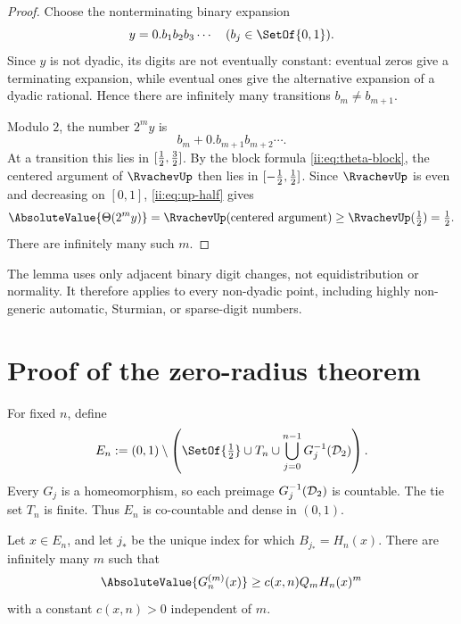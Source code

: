 \begin{proof}
Choose the nonterminating binary expansion
\[
 y=0.b_1b_2b_3\cdots\quad(b_j\in\SetOf{0,1}).
\]
Since $y$ is not dyadic, its digits are not eventually constant: eventual zeros give
a terminating expansion, while eventual ones give the alternative expansion of a
dyadic rational.  Hence there are infinitely many transitions
$b_m\neq b_{m+1}$.

Modulo $2$, the number $2^m y$ is
\[
 b_m+0.b_{m+1}b_{m+2}\cdots.
\]
At a transition this lies in $[\tfrac12,\tfrac32]$.  By the block formula
\eqref{ii:eq:theta-block}, the centered argument of $\RvachevUp$ then lies in
$[-\tfrac12,\tfrac12]$.  Since $\RvachevUp$ is even and decreasing on $[0,1]$,
\eqref{ii:eq:up-half} gives
\[
 \AbsoluteValue{\ThetaF(2^m y)}
 =\RvachevUp(\text{centered argument})\geq\RvachevUp(\half)=\half.
\]
There are infinitely many such $m$.
\end{proof}

\begin{remark}
The lemma uses only adjacent binary digit changes, not equidistribution or normality.
It therefore applies to every non-dyadic point, including highly non-generic automatic,
Sturmian, or sparse-digit numbers.
\end{remark}

\section{Proof of the zero-radius theorem}
\label{ii:sec:proof-main}

For fixed $n$, define
\begin{equation}
 E_n:=(0,1)\setminus\left(
 \SetOf{\half}\cup T_n\cup
 \bigcup_{j=0}^{n-1}G_j^{-1}(\D_2)
 \right).
 \label{ii:eq:En}
\end{equation}
Every $G_j$ is a homeomorphism, so each preimage $G_j^{-1}(\mathcal D_2)$ is countable.
The tie set $T_n$ is finite.  Thus $E_n$ is co-countable and dense in $(0,1)$.

\begin{proposition}
\label{ii:prop:dominant-lower-bound}
Let $x\in E_n$, and let $j_*$ be the unique index for which
$B_{j_*}=H_n(x)$.  There are infinitely many $m$ such that
\begin{equation}
 \AbsoluteValue{G_n^{(m)}(x)}
 \geq c(x,n)Q_mH_n(x)^m
 \label{ii:eq:dominant-lower-bound}
\end{equation}
with a constant $c(x,n)>0$ independent of $m$.
\end{proposition}

